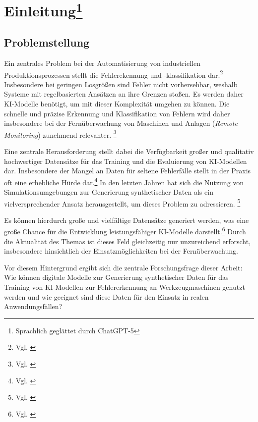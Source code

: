 \chapter[Einleitung]{Einleitung\footnote{Sprachlich geglättet durch ChatGPT-5}}\label{chapter:einleitung}

\section{Problemstellung}\label{sec:problemstellung}

Ein zentrales Problem bei der Automatisierung von industriellen Produktionsprozessen stellt die Fehlerekennung und -klassifikation dar.\footnote{Vgl.  \cite[439]{wu_transformer-based_2023}} Insbesondere bei geringen Losgrößen sind Fehler nicht vorhersehbar, weshalb Systeme mit regelbasierten Ansätzen an ihre Grenzen stoßen. Es werden daher \ac{KI}-Modelle benötigt, um mit dieser Komplexität umgehen zu können. Die schnelle und präzise Erkennung und Klassifikation von Fehlern wird daher insbesondere bei der Fernüberwachung von Maschinen und Anlagen (\textit{Remote Monitoring}) zunehmend relevanter. \footnote{Vgl. \cite[S. 1 f.]{leite_fault_2024}}

Eine zentrale Herausforderung stellt dabei die Verfügbarkeit großer und qualitativ hochwertiger Datensätze für das Training und die Evaluierung von \ac{KI}-Modellen dar. Insbesondere der Mangel an Daten für seltene Fehlerfälle stellt in der Praxis oft eine erhebliche Hürde dar.\footnote{Vgl. \cite[250]{urgo_monitoring_2024}} In den letzten Jahren hat sich die Nutzung von Simulationsumgebungen zur Generierung synthetischer Daten als ein vielversprechender Ansatz herausgestellt, um dieses Problem zu adressieren. \footnote{Vgl. \cite[S. 1101 f.]{schmedemann_procedural_2022}}

Es können hierdurch große und vielfältige Datensätze generiert werden, was eine große Chance für die Entwicklung leistungsfähiger \ac{KI}-Modelle darstellt.\footnote{Vgl. \cite[768]{monnet_investigating_2024}} Durch die Aktualität des Themas ist dieses Feld gleichzeitig nur unzureichend erforscht, insbesondere hinsichtlich der Einsatzmöglichkeiten bei der Fernüberwachung.

Vor diesem Hintergrund ergibt sich die zentrale Forschungsfrage dieser Arbeit: Wie können digitale Modelle zur Generierung synthetischer Daten für das Training von \ac{KI}-Modellen zur Fehlererkennung an Werkzeugmaschinen genutzt werden und wie geeignet sind diese Daten für den Einsatz in realen Anwendungsfällen?

